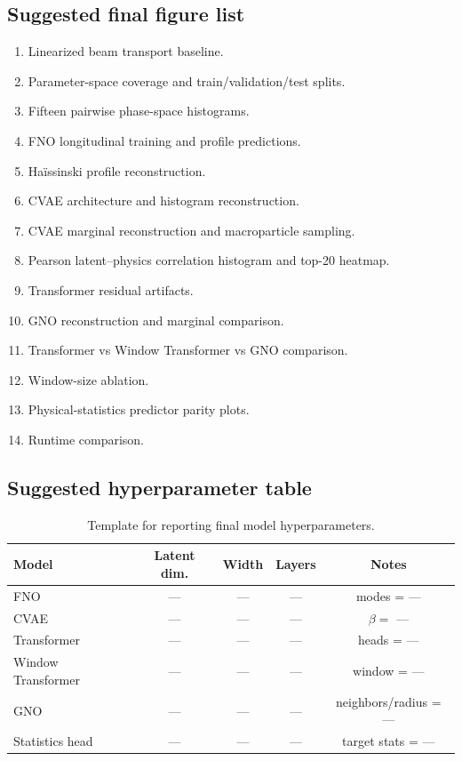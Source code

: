 \documentclass[11pt,a4paper]{article}
\begin{document}
\begin{sloppypar}
\subsection{Suggested final figure list}
\begin{enumerate}[label=Fig.~\arabic*:, leftmargin=2.2cm]
    \item Linearized beam transport baseline.
    \item Parameter-space coverage and train/validation/test splits.
    \item Fifteen pairwise phase-space histograms.
    \item FNO longitudinal training and profile predictions.
    \item Ha\"issinski profile reconstruction.
    \item CVAE architecture and histogram reconstruction.
    \item CVAE marginal reconstruction and macroparticle sampling.
    \item Pearson latent--physics correlation histogram and top-20 heatmap.
    \item Transformer residual artifacts.
    \item GNO reconstruction and marginal comparison.
    \item Transformer vs Window Transformer vs GNO comparison.
    \item Window-size ablation.
    \item Physical-statistics predictor parity plots.
    \item Runtime comparison.
\end{enumerate}

\subsection{Suggested hyperparameter table}
\begin{table}[H]
\centering
\caption{Template for reporting final model hyperparameters.}
\label{tab:hyperparameters_v2}
\begin{tabular}{lcccc}
\toprule
Model & Latent dim. & Width & Layers & Notes \\
\midrule
FNO & --- & --- & --- & modes = --- \\
CVAE & --- & --- & --- & $\beta=$ --- \\
Transformer & --- & --- & --- & heads = --- \\
Window Transformer & --- & --- & --- & window = --- \\
GNO & --- & --- & --- & neighbors/radius = --- \\
Statistics head & --- & --- & --- & target stats = --- \\
\bottomrule
\end{tabular}
\end{table}

\end{sloppypar}
\end{document}
